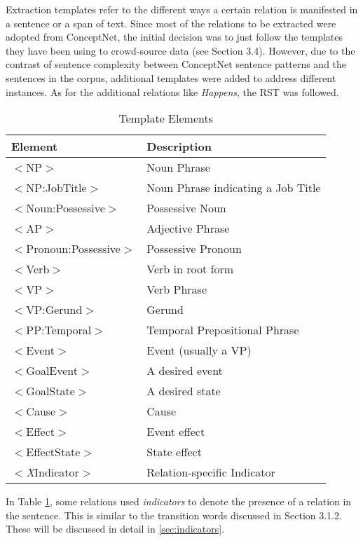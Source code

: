 Extraction templates refer to the different ways a certain relation is manifested in a sentence or a span of text. Since most of the relations to be extracted were adopted from ConceptNet, the initial decision was to just follow the templates they have been using to crowd-source data (see Section 3.4). However, due to the contrast of sentence complexity between ConceptNet sentence patterns and the sentences in the corpus, additional templates were added to address different instances. As for the additional relations like \textit{Happens}, the RST was followed.

\begin{table}[H]   %
\centering
\caption{Template Elements} \vspace{0.25em}
\begin{tabular}{|p{4cm}|p{6.5cm}|} \hline
Element & Description \\ \hline
$<$NP$>$					& Noun Phrase \\ \hline
$<$NP:JobTitle$>$			& Noun Phrase indicating a Job Title \\ \hline
$<$Noun:Possessive$>$		& Possessive Noun \\ \hline
$<$AP$>$					& Adjective Phrase \\ \hline
$<$Pronoun:Possessive$>$	& Possessive Pronoun \\ \hline
$<$Verb$>$					& Verb in root form \\ \hline
$<$VP$>$					& Verb Phrase \\ \hline
$<$VP:Gerund$>$				& Gerund \\ \hline
$<$PP:Temporal$>$			& Temporal Prepositional Phrase \\ \hline
$<$Event$>$					& Event (usually a VP) \\ \hline
$<$GoalEvent$>$				& A desired event \\ \hline
$<$GoalState$>$				& A desired state \\ \hline
$<$Cause$>$					& Cause \\ \hline
$<$Effect$>$				& Event effect \\ \hline
$<$EffectState$>$			& State effect \\ \hline
$<$\textit{X}Indicator$>$	& Relation-specific Indicator \\ \hline
\end{tabular}
\label{tab:templateelements}
\end{table}

In Table \ref{tab:templateelements}, some relations used \textit{indicators} to denote the presence of a relation in the sentence. This is similar to the transition words discussed in Section 3.1.2. These will be discussed in detail in \ref{sec:indicators}.

